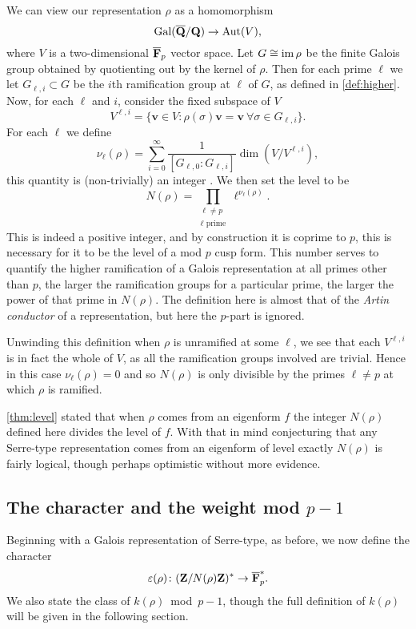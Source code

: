 \documentclass[a4paper,12pt]{article}
\begin{document}
We can view our representation $\rho$ as a homomorphism
\[
\operatorname{Gal}(\overline{\mathbf{Q}}/\mathbf{Q}) \to \operatorname{Aut}(V),
\]
where $V$ is a two-dimensional $\overline{\mathbf{F}}_p$ vector space.
Let $G\cong \operatorname{im} \rho$ be the finite Galois group obtained by quotienting out by the kernel of $\rho$.
Then for each prime $\ell$ we let $G_{\ell,i}\subset G$ be the $i$th ramification group at $\ell$ of $G$, as defined in \cref{def:higher}.
Now, for each $\ell$ and $i$, consider the fixed subspace of $V$
\[
V^{\ell,i} = \{\mathbf{v}\in V : \rho(\sigma) \mathbf{v} = \mathbf{v}\ \forall \sigma \in G_{\ell,i}\}.
\]
For each $\ell$ we define
\[
\nu_\ell(\rho) = \sum_{i = 0}^{\infty} \frac{1}{[G_{\ell,0} : G_{\ell,i}]} \dim(V/V^{\ell,i}),
\]
this quantity is (non-trivially) an integer \cite[p. 99]{SerreLF}.
We then set the level to be
\[
N(\rho) = \prod_{\substack{\ell \ne p\\ \ell\text{ prime}}} \ell^{\nu_\ell(\rho)}.
\]
This is indeed a positive integer, and by construction it is coprime to $p$, this is necessary for it to be the level of a mod $p$ cusp form.
This number serves to quantify the higher ramification of a Galois representation at all primes other than $p$, the larger the ramification groups for a particular prime, the larger the power of that prime in $N(\rho)$.
The definition here is almost that of the \emph{Artin conductor} of a representation, but here the $p$-part is ignored.

\begin{rmk}\label{rmk:unram}
Unwinding this definition when $\rho$ is unramified at some $\ell$, we see that each $V^{\ell,i}$ is in fact the whole of $V$, as all the ramification groups involved are trivial.
Hence in this case $\nu_\ell(\rho) = 0$ and so $N(\rho)$ is only divisible by the primes $\ell \ne p$ at which $\rho$ is ramified.
\end{rmk}

\cref{thm:level} stated that when $\rho$ comes from an eigenform $f$ the integer $N(\rho)$ defined here divides the level of $f$.
With that in mind conjecturing that any Serre-type representation comes from an eigenform of level exactly $N(\rho)$ is fairly logical, though perhaps optimistic without more evidence.


\subsection{The character and the weight mod $p-1$}\label{subsec:char}
Beginning with a Galois representation of Serre-type, as before, we now define the character
\[
\varepsilon(\rho)\colon  (\mathbf{Z}/N(\rho)\mathbf{Z})^* \to \overline{\mathbf{F}}_p^*.
\]
We also state the class of $k(\rho)$~mod~$p-1$, though the full definition of $k(\rho)$ will be given in the following section.
\end{document}
